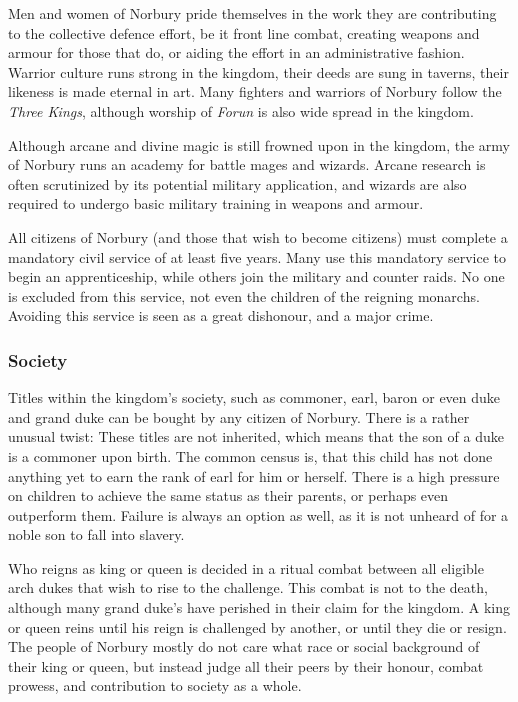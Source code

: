 Men and women of Norbury pride themselves in the work they are contributing to
the collective defence effort, be it front line combat, creating weapons and
armour for those that do, or aiding the effort in an administrative
fashion. Warrior culture runs strong in the kingdom, their deeds are sung in
taverns, their likeness is made eternal in art. Many fighters and warriors of
Norbury follow the \emph{Three Kings}, although worship of \emph{Forun} is also
wide spread in the kingdom.

Although arcane and divine magic is still frowned upon in the kingdom, the army
of Norbury runs an academy for battle mages and wizards. Arcane research is
often scrutinized by its potential military application, and wizards are also
required to undergo basic military training in weapons and armour.

All citizens of Norbury (and those that wish to become citizens) must complete
a mandatory civil service of at least five years. Many use this mandatory
service to begin an apprenticeship, while others join the military and counter
raids. No one is excluded from this service, not even the children of the
reigning monarchs. Avoiding this service is seen as a great dishonour, and a
major crime.

\subsubsection*{Society}

Titles within the kingdom's society, such as commoner, earl, baron or even
duke and grand duke can be bought by any citizen of Norbury. There is a rather
unusual twist: These titles are not inherited, which means that the son of a
duke is a commoner upon birth. The common census is, that this child has not
done anything yet to earn the rank of earl for him or herself. There is a high
pressure on children to achieve the same status as their parents, or perhaps
even outperform them. Failure is always an option as well, as it is not
unheard of for a noble son to fall into slavery.

Who reigns as king or queen is decided in a ritual combat between all eligible
arch dukes that wish to rise to the challenge. This combat is not to the
death, although many grand duke's have perished in their claim for the
kingdom. A king or queen reins until his reign is challenged by another, or
until they die or resign. The people of Norbury mostly do not care what race
or social background of their king or queen, but instead judge all their peers
by their honour, combat prowess, and contribution to society as a whole.

